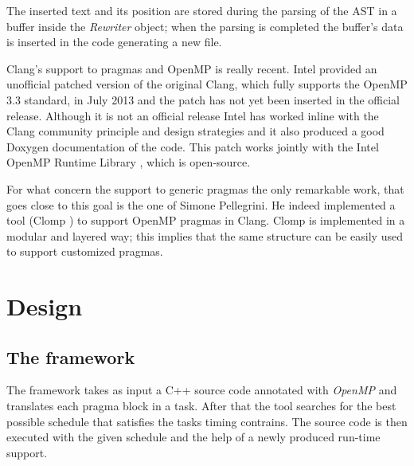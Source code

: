 \documentclass[a4paper,11pt,oneside]{book}
\begin{document}
The inserted text and its position are stored during the parsing of the AST in a buffer inside the \emph{Rewriter} object; when the parsing is completed the buffer’s data is inserted in the code generating a new file. 

Clang’s support to pragmas and OpenMP is really recent. Intel provided an unofficial patched version of the original Clang, which fully supports the OpenMP 3.3 standard, in July 2013 and the patch has not yet been inserted in the official release. Although it is not an official release Intel has worked inline with the Clang community principle and design strategies and it also produced a good Doxygen documentation of the code. This patch works jointly with the Intel OpenMP Runtime Library \cite{intelomprtl}, which is open-source. 

For what concern the support to generic pragmas the only remarkable work, that goes close to this goal is the one of Simone Pellegrini. He indeed implemented a tool (Clomp \cite{clomp}) to support OpenMP pragmas in Clang. Clomp is implemented in a modular and layered way; this implies that the same structure can be easily used to support customized pragmas.
 



\chapter{Design}
\section{The framework}

The framework takes as input a C++ source code annotated with \emph{OpenMP} and translates each pragma block in a task. After that the tool searches for the best possible schedule that satisfies the tasks timing contrains. The source code is then executed with the given schedule and the help of a newly produced run-time support.
\end{document}
